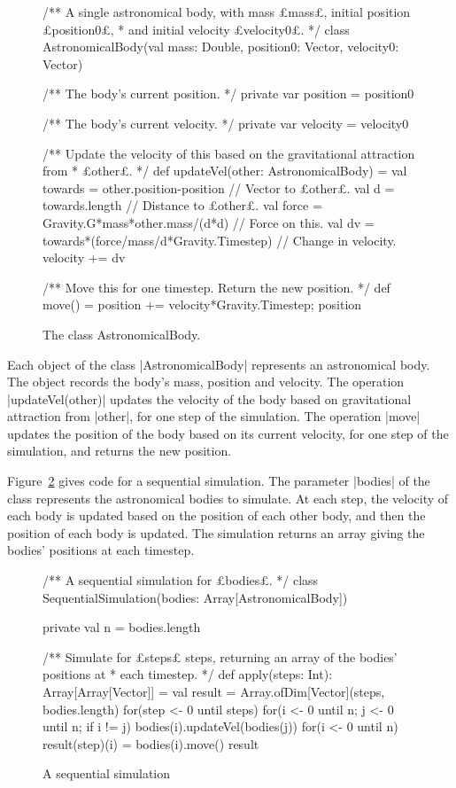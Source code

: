 \begin{figure}
\begin{scala}
/** A single astronomical body, with mass £mass£, initial position £position0£,
  * and initial velocity £velocity0£. */
class AstronomicalBody(val mass: Double, position0: Vector, velocity0: Vector){
  /** The body's current position. */
  private var position = position0

  /** The body's current velocity. */
  private var velocity = velocity0

  /** Update the velocity of this based on the gravitational attraction from
    * £other£. */
  def updateVel(other: AstronomicalBody) = {
    val towards = other.position-position // Vector to £other£.
    val d = towards.length // Distance to £other£.
    val force = Gravity.G*mass*other.mass/(d*d) // Force on this.
    val dv = towards*(force/mass/d*Gravity.Timestep) // Change in velocity.
    velocity += dv
  }

  /** Move this for one timestep.  Return the new position. */
  def move() = { position += velocity*Gravity.Timestep; position }
}
\end{scala}
\caption{The class {\scalashape
    AstronomicalBody}.} 
\label{fig:AstronomicalBody}
\end{figure}


Each object of the class |AstronomicalBody| represents an astronomical body.
The object records the body's mass, position and velocity.  The operation
|updateVel(other)| updates the velocity of the body based on gravitational
attraction from |other|, for one step of the simulation.  The operation |move|
updates the position of the body based on its current velocity, for one step
of the simulation, and returns the new position.

Figure~\ref{fig:SequentialSimulation} gives code for a sequential simulation.
The parameter |bodies| of the class represents the astronomical bodies to
simulate.  At each step, the velocity of each body is updated based on the
position of each other body, and then the position of each body is updated.
The simulation returns an array giving the bodies' positions at each
timestep. 


\begin{figure}
\begin{scala}
/** A sequential simulation for £bodies£. */
class SequentialSimulation(bodies: Array[AstronomicalBody]){
  private val n = bodies.length

  /** Simulate for £steps£ steps, returning an array of the bodies' positions at
    * each timestep. */
  def apply(steps: Int): Array[Array[Vector]] = {
    val result = Array.ofDim[Vector](steps, bodies.length)
    for(step <- 0 until steps){
      for(i <- 0 until n; j <- 0 until n; if i != j) 
        bodies(i).updateVel(bodies(j))
      for(i <- 0 until n) result(step)(i) = bodies(i).move()
    }
    result
  }
}
\end{scala}
\caption{A sequential simulation}
\label{fig:SequentialSimulation}
\end{figure}

